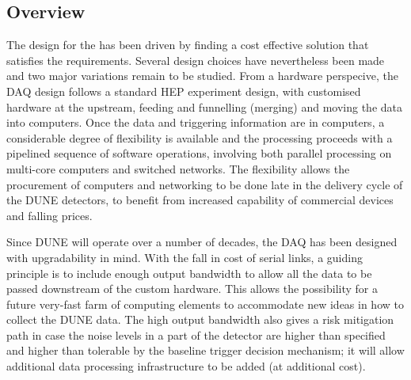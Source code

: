 \subsection{Overview}
\label{sec:fd-daq-overview}



The design for the  has been driven by finding a cost
effective solution that satisfies the requirements. Several design
choices have nevertheless been made and two major variations remain to
be studied. 
From a hardware perspecive, the DAQ design follows a standard HEP
experiment design, with customised hardware at the upstream, feeding
and funnelling (merging) and moving the data into computers. 
Once the data and triggering information are in computers, a
considerable degree of flexibility is available and the processing
proceeds with a pipelined sequence of software operations, involving
both parallel processing on multi-core computers and switched
networks. The flexibility allows the procurement of computers and
networking to be done late in the delivery cycle of the DUNE
detectors, to benefit from increased capability of commercial devices
and falling prices.

Since DUNE will operate over a number of decades, the DAQ has been
designed with upgradability in mind. 
With the fall in cost of serial links, a guiding principle is to
include enough output bandwidth to allow all the data to be passed
downstream of the custom hardware.
This allows the possibility for a future very-fast farm of computing
elements to accommodate new ideas in how to collect the DUNE data. 
The high output bandwidth also gives a risk mitigation path in case
the noise levels in a part of the detector are higher than specified
and higher than tolerable by the baseline trigger decision mechanism;
it will allow additional data processing infrastructure to be added
(at additional cost).

